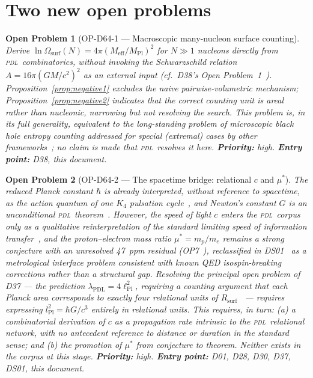 \documentclass[12pt,a4paper]{article}
\newtheorem{openproblem}{Open Problem}
\newcommand{\Kfour}{K_4}
\newcommand{\hb}{\hbar}
\newcommand{\PDL}{\textsc{pdl}}
\newcommand{\Rsurf}{R_{\mathrm{surf}}}
\newcommand{\Omegasurf}{\Omega_{\mathrm{surf}}}
\newcommand{\lPl}{\ell_{\mathrm{Pl}}}
\newcommand{\Meff}{M_{\mathrm{eff}}}
\newcommand{\MPl}{M_{\mathrm{Pl}}}
\begin{document}
\section{Two new open problems}
\label{sec:open}

\begin{openproblem}[OP-D64-1 --- Macroscopic many-nucleon surface counting]
\label{op:D64-1}
Derive $\ln\Omegasurf(N) = 4\pi(\Meff/\MPl)^2$ for $N\gg1$ nucleons directly from \PDL\ combinatorics, without invoking the Schwarzschild relation $A=16\pi(GM/c^2)^2$ as an external input (cf.\ D38's Open Problem~1~\cite{PDL_D38_2026}). Proposition~\ref{prop:negative1} excludes the naive pairwise-volumetric mechanism; Proposition~\ref{prop:negative2} indicates that the correct counting unit is areal rather than nucleonic, narrowing but not resolving the search. This problem is, in its full generality, equivalent to the long-standing problem of microscopic black hole entropy counting addressed for special (extremal) cases by other frameworks~\cite{StromingerVafa1996}; no claim is made that \PDL\ resolves it here. \textbf{Priority:} high. \textbf{Entry point:} D38, this document.
\end{openproblem}

\begin{openproblem}[OP-D64-2 --- The spacetime bridge: relational $c$ and $\mu^*$]
\label{op:D64-2}
The reduced Planck constant $\hb$ is already interpreted, without reference to spacetime, as the action quantum of one $\Kfour$ pulsation cycle~\cite{PDL_D01_2026}, and Newton's constant $G$ is an unconditional \PDL\ theorem~\cite{PDL_D21_2026,PDL_D43_2026,PDL_D44_2026}. However, the speed of light $c$ enters the \PDL\ corpus only as a qualitative reinterpretation of the standard limiting speed of information transfer~\cite{PDL_D01_2026}, and the proton--electron mass ratio $\mu^* = m_p/m_e$ remains a strong conjecture with an unresolved 47~ppm residual (OP7~\cite{PDL_D28_2026,PDL_D30_2026}), reclassified in DS01~\cite{PDL_DS01_2026} as a metrological interface problem consistent with known QED isospin-breaking corrections rather than a structural gap. Resolving the principal open problem of D37 --- the prediction $\lambda_{\mathrm{PDL}}=4\lPl^2$, requiring a counting argument that each Planck area corresponds to exactly four relational units of $\Rsurf$~\cite{PDL_D37_2026} --- requires expressing $l_{\mathrm{Pl}}^2 = \hb G/c^3$ entirely in relational units. This requires, in turn: (a) a combinatorial derivation of $c$ as a propagation rate intrinsic to the \PDL\ relational network, with no antecedent reference to distance or duration in the standard sense; and (b) the promotion of $\mu^*$ from conjecture to theorem. Neither exists in the corpus at this stage. \textbf{Priority:} high. \textbf{Entry point:} D01, D28, D30, D37, DS01, this document.
\end{openproblem}
\end{document}
